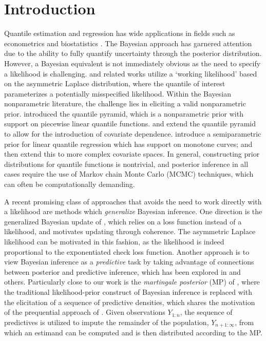 \documentclass[11pt,a4paper]{article}
\begin{document}
\section{Introduction}
Quantile estimation and regression has wide applications in fields such as econometrics and biostatistics \citep{Koenker1978}. 
{The Bayesian approach has garnered attention due to the ability to fully quantify uncertainty through the posterior distribution.}
However, a Bayesian equivalent is not immediately obvious as the need to specify a likelihood is challenging.  \cite{Yu2001,Yang2016} and related works utilize a `working likelihood' based on the asymmetric Laplace distribution, where the quantile of interest parameterizes a potentially misspecified likelihood.  Within the Bayesian nonparametric literature, {the challenge lies in eliciting a valid nonparametric prior}. \cite{Hjort2009} introduced the quantile pyramid, which is a nonparametric prior with support on piecewise linear quantile functions. \cite{Rodrigues2019} and \cite{An2024} extend the quantile pyramid to allow for the introduction of covariate dependence. \cite{Tokdar2012} introduce a semiparametric prior for linear quantile regression which has support on monotone curves; \cite{Yang2017} and \cite{Chen2021} then extend this to more complex covariate spaces. In general, constructing prior distributions for quantile functions is nontrivial, and posterior inference in all cases require the use of Markov chain Monte Carlo (MCMC) techniques, which can often be computationally demanding. 

A recent promising class of approaches that avoids the need to work directly with a likelihood are methods which \textit{generalize} Bayesian inference. One direction is the  generalized Bayesian update of \cite{Bissiri2016}, which relies on a loss function instead of a likelihood, and motivates updating through coherence. The asymmetric Laplace likelihood can be motivated in this fashion, as the likelihood is indeed proportional to the exponentiated check loss function. Another approach is to view Bayesian inference as a \textit{predictive} task by taking advantage of connections between posterior and predictive inference, which has been explored in \cite{Berti2020,Fong2023a,Fortini2020,Fortini2023} and others. Particularly close to our work is the \textit{martingale posterior} (MP) of \cite{Fong2023a}, where the traditional likelihood-prior construct of Bayesian inference is replaced with the elicitation of a sequence of predictive densities, which shares the motivation of the prequential approach of \cite{Dawid1984}. Given observations $Y_{1:n}$, the sequence of predictives is utilized to impute the remainder of the population, $Y_{n+1:\infty}$, from which an estimand can be computed and is then distributed according to the MP.
\end{document}
